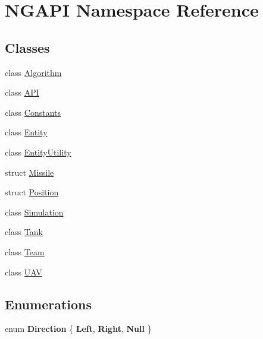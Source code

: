 \hypertarget{namespace_n_g_a_p_i}{}\section{N\+G\+A\+PI Namespace Reference}
\label{namespace_n_g_a_p_i}
\subsection*{Classes}
\begin{DoxyCompactItemize}
\item 
class \hyperlink{class_n_g_a_p_i_1_1_algorithm}{Algorithm}
\item 
class \hyperlink{class_n_g_a_p_i_1_1_a_p_i}{A\+PI}
\item 
class \hyperlink{class_n_g_a_p_i_1_1_constants}{Constants}
\item 
class \hyperlink{class_n_g_a_p_i_1_1_entity}{Entity}
\item 
class \hyperlink{class_n_g_a_p_i_1_1_entity_utility}{Entity\+Utility}
\item 
struct \hyperlink{struct_n_g_a_p_i_1_1_missile}{Missile}
\item 
struct \hyperlink{struct_n_g_a_p_i_1_1_position}{Position}
\item 
class \hyperlink{class_n_g_a_p_i_1_1_simulation}{Simulation}
\item 
class \hyperlink{class_n_g_a_p_i_1_1_tank}{Tank}
\item 
class \hyperlink{class_n_g_a_p_i_1_1_team}{Team}
\item 
class \hyperlink{class_n_g_a_p_i_1_1_u_a_v}{U\+AV}
\end{DoxyCompactItemize}
\subsection*{Enumerations}
\begin{DoxyCompactItemize}
\item 
\mbox{\label{namespace_n_g_a_p_i_a505c4e8af373b06d1240e4ce7719e8a2}} 
enum {\bfseries Direction} \{ {\bfseries Left}, 
{\bfseries Right}, 
{\bfseries Null}
 \}
\end{DoxyCompactItemize}
